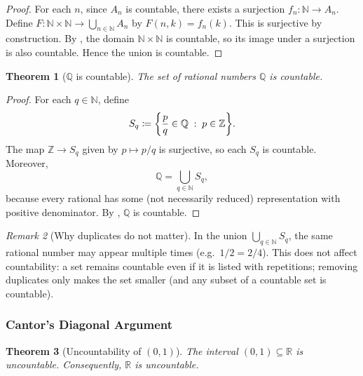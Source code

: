 \documentclass[12pt]{article}
\numberwithin{equation}{section}
\newcommand{\RR}{\mathbb{R}}
\newcommand{\QQ}{\mathbb{Q}}
\newcommand{\ZZ}{\mathbb{Z}}
\newcommand{\NN}{\mathbb{N}}
\DeclarePairedDelimiter{\set}{\{}{\}}
\newcommand{\st}{\;:\;}                      %
\theoremstyle{plain}
\newtheorem{theorem}{Theorem}[section]
\theoremstyle{definition}
\theoremstyle{remark}
\newtheorem{remark}[theorem]{Remark}
\begin{document}
\begin{proof}
For each $n$, since $A_n$ is countable, there exists a surjection $f_n:\NN\to A_n$.  
Define $F:\NN\times\NN\to \bigcup_{n\in\NN} A_n$ by $F(n,k)=f_n(k)$. This is surjective by construction.  
By , the domain $\NN\times\NN$ is countable, so its image under a surjection is also countable. Hence the union is countable.
\end{proof}

\begin{theorem}[$\QQ$ is countable]\label{thm:Q-countable}
The set of rational numbers $\QQ$ is countable.
\end{theorem}

\begin{proof}
For each $q\in\NN$, define
\[
S_q \coloneqq \set*{\frac{p}{q}\in\QQ \st p\in\ZZ}.
\]
The map $\ZZ\to S_q$ given by $p\mapsto p/q$ is surjective, so each $S_q$ is countable.  
Moreover,
\[
\QQ = \bigcup_{q\in\NN} S_q,
\]
because every rational has some (not necessarily reduced) representation with positive denominator.  
By , $\QQ$ is countable.
\end{proof}

\begin{remark}[Why duplicates do not matter]
In the union $\bigcup_{q\in\NN} S_q$, the same rational number may appear multiple times (e.g.\ $1/2=2/4$).  
This does not affect countability: a set remains countable even if it is listed with repetitions; removing duplicates only makes the set smaller (and any subset of a countable set is countable).
\end{remark}

\subsubsection{Cantor's Diagonal Argument}

\begin{theorem}[Uncountability of $(0,1)$]\label{thm:cantor}
The interval $(0,1)\subseteq\RR$ is uncountable. Consequently, $\RR$ is uncountable.
\end{theorem}
\end{document}
